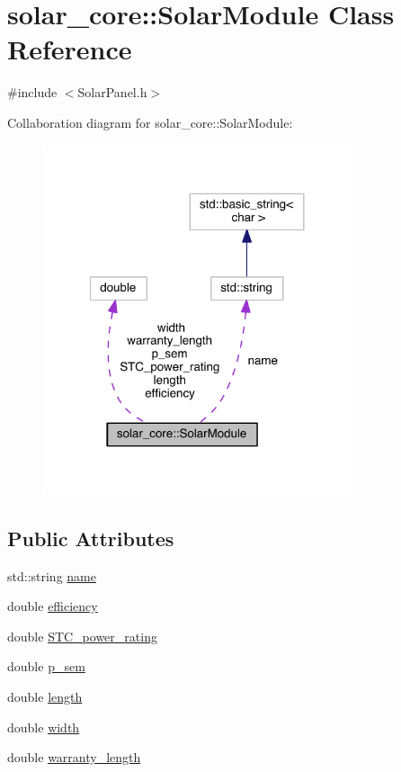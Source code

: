 \hypertarget{classsolar__core_1_1_solar_module}{}\section{solar\+\_\+core\+:\+:Solar\+Module Class Reference}
\label{classsolar__core_1_1_solar_module}


{\ttfamily \#include $<$Solar\+Panel.\+h$>$}



Collaboration diagram for solar\+\_\+core\+:\+:Solar\+Module\+:
\nopagebreak
\begin{figure}[H]
\begin{center}
\leavevmode
\includegraphics[width=257pt]{classsolar__core_1_1_solar_module__coll__graph}
\end{center}
\end{figure}
\subsection*{Public Attributes}
\begin{DoxyCompactItemize}
\item 
std\+::string \hyperlink{classsolar__core_1_1_solar_module_abc9bb9bae1546dee017d598ef7baa952}{name}
\item 
double \hyperlink{classsolar__core_1_1_solar_module_a0303a0da750be23a4a408645d838ed24}{efficiency}
\item 
double \hyperlink{classsolar__core_1_1_solar_module_ada72a54d3a914a88fd3942f1a09065c1}{S\+T\+C\+\_\+power\+\_\+rating}
\item 
double \hyperlink{classsolar__core_1_1_solar_module_a34233be4549eb826fa5a4cc6a20993e3}{p\+\_\+sem}
\item 
double \hyperlink{classsolar__core_1_1_solar_module_a34cc7ce18770e51c87a3655f6f481be0}{length}
\item 
double \hyperlink{classsolar__core_1_1_solar_module_a72b5c417f88deb65818e96b5fcf52ef9}{width}
\item 
double \hyperlink{classsolar__core_1_1_solar_module_a88f461fc1142688294bf19ca02b7ec0d}{warranty\+\_\+length}
\end{DoxyCompactItemize}


